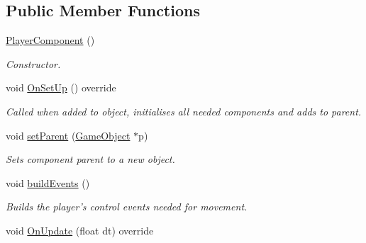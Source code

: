 \subsection*{Public Member Functions}
\begin{DoxyCompactItemize}
\item 
\hypertarget{class_player_component_adf9bdf600a6cc7d34aa848163c4a9be7}{\hyperlink{class_player_component_adf9bdf600a6cc7d34aa848163c4a9be7}{Player\+Component} ()}\label{class_player_component_adf9bdf600a6cc7d34aa848163c4a9be7}

\begin{DoxyCompactList}\small\item\em Constructor. \end{DoxyCompactList}\item 
\hypertarget{class_player_component_a949792196197b92dfc1631fb66234868}{void \hyperlink{class_player_component_a949792196197b92dfc1631fb66234868}{On\+Set\+Up} () override}\label{class_player_component_a949792196197b92dfc1631fb66234868}

\begin{DoxyCompactList}\small\item\em Called when added to object, initialises all needed components and adds to parent. \end{DoxyCompactList}\item 
\hypertarget{class_player_component_a5a153f0d90650d6b9bf07fa2fac44ec3}{void \hyperlink{class_player_component_a5a153f0d90650d6b9bf07fa2fac44ec3}{set\+Parent} (\hyperlink{class_game_object}{Game\+Object} $\ast$p)}\label{class_player_component_a5a153f0d90650d6b9bf07fa2fac44ec3}

\begin{DoxyCompactList}\small\item\em Sets component parent to a new object. \end{DoxyCompactList}\item 
\hypertarget{class_player_component_a057ce51dc6ef125a4e90ec8c92b2147b}{void \hyperlink{class_player_component_a057ce51dc6ef125a4e90ec8c92b2147b}{build\+Events} ()}\label{class_player_component_a057ce51dc6ef125a4e90ec8c92b2147b}

\begin{DoxyCompactList}\small\item\em Builds the player's control events needed for movement. \end{DoxyCompactList}\item 
\hypertarget{class_player_component_a2e999887dae2451eebb7c173415d98be}{void \hyperlink{class_player_component_a2e999887dae2451eebb7c173415d98be}{On\+Update} (float dt) override}\label{class_player_component_a2e999887dae2451eebb7c173415d98be}


\end{DoxyCompactItemize}
